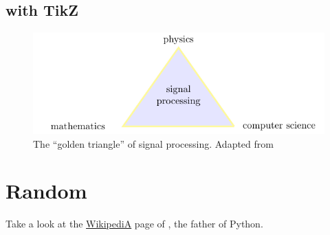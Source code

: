 \documentclass{article}
\begin{document}

	\subsection{with TikZ} %
	\label{sub:with_tikz}

	\begin{figure}[h]
		\centering
		\includegraphics{images/goldentriangle}
		\caption{The ``golden triangle'' of signal processing. Adapted from \cite{Flandrin18theconversation}}
	\end{figure}



\section{Random} %
\label{sec:random}

	Take a look at the \href{https://en.wikipedia.org/wiki/Guido_van_Rossum}{WikipediA} page of \citet{Python}, the father of Python.





\end{document}
